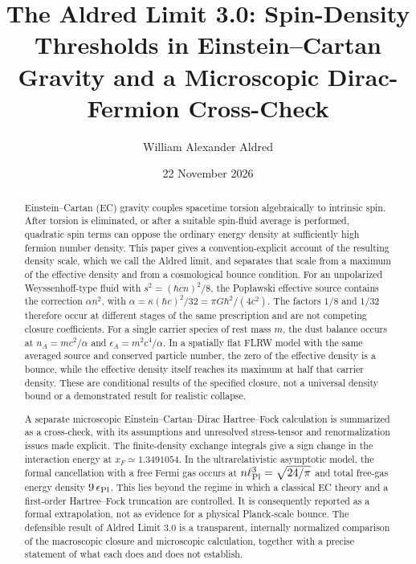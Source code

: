 \documentclass[11pt]{article}
\title{The Aldred Limit 3.0: Spin-Density Thresholds in Einstein--Cartan Gravity and a Microscopic Dirac-Fermion Cross-Check}
\author{William Alexander Aldred}
\affil{Aldred Industries}
\date{22 November 2026}
\begin{document}
\maketitle
\begin{abstract}
Einstein--Cartan (EC) gravity couples spacetime torsion algebraically to intrinsic spin. After torsion is eliminated, or after a suitable spin-fluid average is performed, quadratic spin terms can oppose the ordinary energy density at sufficiently high fermion number density. This paper gives a convention-explicit account of the resulting density scale, which we call the Aldred limit, and separates that scale from a maximum of the effective density and from a cosmological bounce condition. For an unpolarized Weyssenhoff-type fluid with $s^2=(\hbar c n)^2/8$, the Pop\l{}awski effective source contains the correction $\alpha n^2$, with $\alpha=\kappa(\hbar c)^2/32=\pi G\hbar^2/(4c^2)$. The factors $1/8$ and $1/32$ therefore occur at different stages of the same prescription and are not competing closure coefficients. For a single carrier species of rest mass $m$, the dust balance occurs at $n_A=mc^2/\alpha$ and $\epsilon_A=m^2c^4/\alpha$. In a spatially flat FLRW model with the same averaged source and conserved particle number, the zero of the effective density is a bounce, while the effective density itself reaches its maximum at half that carrier density. These are conditional results of the specified closure, not a universal density bound or a demonstrated result for realistic collapse.

A separate microscopic Einstein--Cartan--Dirac Hartree--Fock calculation is summarized as a cross-check, with its assumptions and unresolved stress-tensor and renormalization issues made explicit. The finite-density exchange integrals give a sign change in the interaction energy at $x_F\simeq1.3491054$. In the ultrarelativistic asymptotic model, the formal cancellation with a free Fermi gas occurs at $n\ell_{\rm Pl}^3=\sqrt{24/\pi}$ and total free-gas energy density $9\,\epsilon_{\rm Pl}$. This lies beyond the regime in which a classical EC theory and a first-order Hartree--Fock truncation are controlled. It is consequently reported as a formal extrapolation, not as evidence for a physical Planck-scale bounce. The defensible result of Aldred Limit 3.0 is a transparent, internally normalized comparison of the macroscopic closure and microscopic calculation, together with a precise statement of what each does and does not establish.
\end{abstract}
\end{document}
